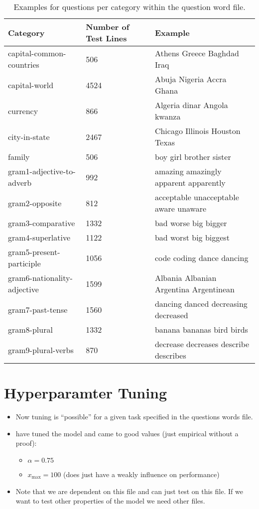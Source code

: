 \begin{center}
\begin{table}
\begin{tabular}{ l | R{2.5cm} | l }
\hline
\textbf{Category} & \textbf{Number of Test Lines} & \textbf{Example}\\
\hline\hline
capital-common-countries & 506 & Athens Greece Baghdad Iraq\\
\hline
capital-world & 4524 & Abuja Nigeria Accra Ghana\\
\hline
currency & 866 & Algeria dinar Angola kwanza\\
\hline
city-in-state & 2467 & Chicago Illinois Houston Texas\\
\hline
family & 506 & boy girl brother sister\\
\hline
gram1-adjective-to-adverb & 992 & amazing amazingly apparent apparently\\
\hline
gram2-opposite & 812 & acceptable unacceptable aware unaware\\
\hline
gram3-comparative & 1332 & bad worse big bigger\\
\hline
gram4-superlative & 1122 & bad worst big biggest\\
\hline
gram5-present-participle & 1056 & code coding dance dancing\\
\hline
gram6-nationality-adjective & 1599 & Albania Albanian Argentina Argentinean\\
\hline
gram7-past-tense & 1560 & dancing danced decreasing decreased\\
\hline
gram8-plural & 1332 & banana bananas bird birds\\
\hline
gram9-plural-verbs & 870 & decrease decreases describe describes\\
\hline
\end{tabular}
\caption{Examples for questions per category within the question word file.}
\label{tab:qwfile}
\end{table}
\end{center}

\section{Hyperparamter Tuning}

\begin{itemize}
  \item 
    Now tuning is \enquote{possible} for a given task specified in the questions words file.

  \item 
    \cite{pennington2014glove} have tuned the model and came to good values (just 
    empirical without a proof):
    \begin{itemize}
      \item $\alpha = 0.75$
      \item $x_\mathrm{max} = 100$ (does just have a weakly influence on performance)
    \end{itemize}
    
  \item 
    Note that we are dependent on this file and can just test on this file. If 
    we want to test other properties of the model we need other files.
\end{itemize}

